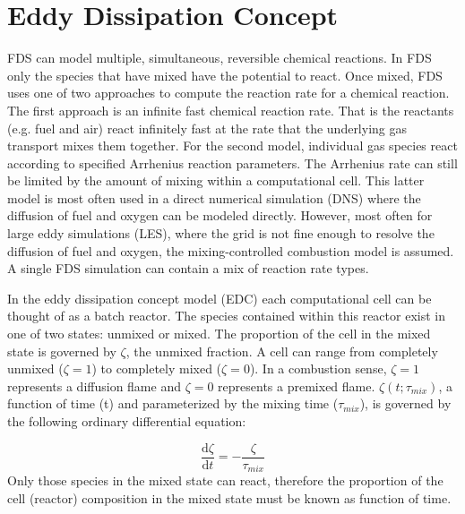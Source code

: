 \section{Eddy Dissipation Concept}
FDS can model multiple, simultaneous, reversible chemical reactions.  In FDS only the species that have mixed have the potential to react. Once mixed, FDS uses one of two approaches to compute the reaction rate for a chemical reaction.  The first approach is an infinite fast chemical reaction rate. That is the reactants (e.g. fuel and air) react infinitely fast at the rate that the underlying gas transport mixes them together.  For the second model, individual gas species react according to specified Arrhenius reaction parameters. The Arrhenius rate can still be limited by the amount of mixing within a computational cell. This latter model is most often used in a direct numerical simulation (DNS) where the diffusion of fuel and oxygen can be modeled directly. However, most often for large eddy simulations (LES), where the grid is not fine enough to resolve the diffusion of fuel and oxygen,
the mixing-controlled combustion model is assumed. A single FDS simulation can contain a mix of reaction rate types.

In the eddy dissipation concept model (EDC) each computational cell can be thought of as a batch reactor. The species contained within this reactor exist in one of two states: unmixed or mixed. The proportion of the cell in the mixed state is governed by $\zeta$, the unmixed fraction. A cell can range from completely unmixed ($\zeta=1$) to completely mixed ($\zeta=0$). In a combustion sense, $\zeta=1$  represents a diffusion flame and $\zeta=0$ represents a premixed flame. $\zeta(t;\tau_{mix})$, a function of time (t) and parameterized by the mixing time ($\tau_{mix}$), is governed by the following ordinary differential equation:

\begin{equation}\label{eq:zeta}
\frac{\mbox{d}\zeta}{\mbox{d}t}=-\frac{\zeta}{\tau_{mix}}
\end{equation}     
Only those species in the mixed state can react, therefore the proportion of the cell (reactor) composition in the mixed state must be known as function of time. 

